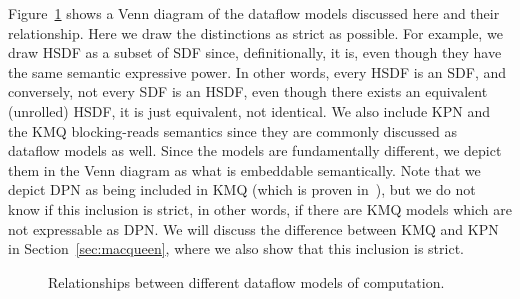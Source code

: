Figure~\ref{fig:dataflow_mocs} shows a Venn diagram of the dataflow models discussed here and their relationship.
Here we draw the distinctions as strict as possible.
For example, we draw \ac{HSDF} as a subset of \ac{SDF} since, definitionally, it is, even though they have the same semantic expressive power.
In other words, every \ac{HSDF} is an \ac{SDF}, and conversely, not every \ac{SDF} is an \ac{HSDF}, even though there exists an equivalent (unrolled) \ac{HSDF}, it is just equivalent, not identical.
We also include \ac{KPN} and the \ac{KMQ} blocking-reads semantics since they are commonly discussed as dataflow models as well.
Since the models are fundamentally different, we depict them in the Venn diagram as what is embeddable semantically.
Note that we depict \ac{DPN} as being included in \ac{KMQ} (which is proven in~\cite{lee_matsikoudis_semantics}), but we do not know if this inclusion is strict, in other words, if there are \ac{KMQ} models which are not expressable as \ac{DPN}.
We will discuss the difference between \ac{KMQ} and \ac{KPN} in Section~\ref{sec:macqueen}, where we also show that this inclusion is strict.

\begin{figure}[h]
	\centering
   \resizebox{0.65\textwidth}{!}{}
	\caption{Relationships between different dataflow models of computation.}
	\label{fig:dataflow_mocs}
\end{figure}